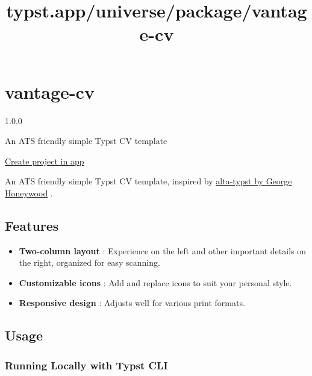 \title{typst.app/universe/package/vantage-cv}

\label{banner}
\label{template-thumbnail}

\section{vantage-cv}\label{vantage-cv}

{ 1.0.0 }

An ATS friendly simple Typst CV template

\href{/app?template=vantage-cv&version=1.0.0}{Create project in app}

\label{readme}
An ATS friendly simple Typst CV template, inspired by
\href{https://github.com/GeorgeHoneywood/alta-typst}{alta-typst by
George Honeywood} .

\subsection{Features}\label{features}

\begin{itemize}
\tightlist
\item
  \textbf{Two-column layout} : Experience on the left and other
  important details on the right, organized for easy scanning.
\item
  \textbf{Customizable icons} : Add and replace icons to suit your
  personal style.
\item
  \textbf{Responsive design} : Adjusts well for various print formats.
\end{itemize}

\subsection{Usage}\label{usage}

\subsubsection{Running Locally with Typst
CLI}\label{running-locally-with-typst-cli}

